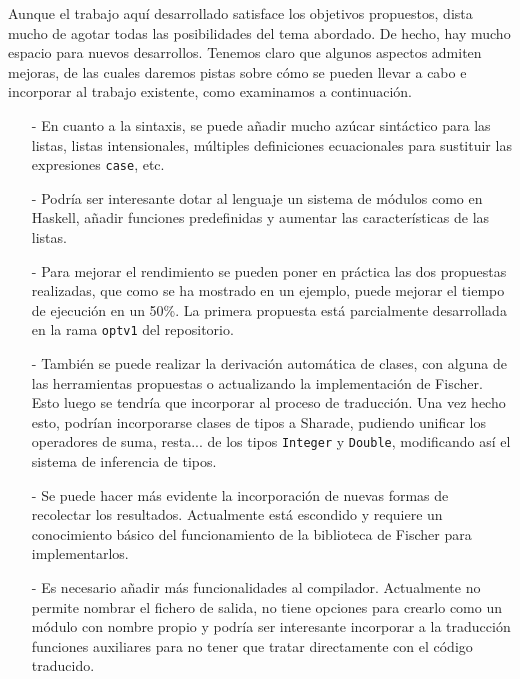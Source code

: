 \documentclass[class=article, crop=false]{standalone}
\begin{document}
Aunque el trabajo aquí desarrollado satisface los objetivos propuestos, dista mucho de agotar
todas las posibilidades del tema abordado. De hecho, hay mucho espacio para nuevos
desarrollos. Tenemos claro que algunos aspectos admiten mejoras, de las cuales daremos pistas
sobre cómo se pueden llevar a cabo e incorporar al trabajo existente, como examinamos a
continuación.

\begin{itemize}
  \item[-] En cuanto a la sintaxis, se puede añadir mucho azúcar sintáctico para las listas,
  listas intensionales, múltiples definiciones ecuacionales para sustituir las expresiones
  \verb`case`, etc.

  \item[-] Podría ser interesante dotar al lenguaje un sistema de módulos como en Haskell,
  añadir funciones predefinidas y aumentar las características de las listas.

  \item[-] Para mejorar el rendimiento se pueden poner en práctica las dos propuestas
  realizadas, que como se ha mostrado en un ejemplo, puede mejorar el tiempo de ejecución en
  un 50\%. La primera propuesta está parcialmente desarrollada en la rama \verb`optv1` del
  repositorio.

  \item[-] También se puede realizar la derivación automática de clases, con alguna de las
  herramientas propuestas o actualizando la implementación de Fischer. Esto luego se tendría
  que incorporar al proceso de traducción. Una vez hecho esto, podrían incorporarse clases de
  tipos a Sharade, pudiendo unificar los operadores de suma, resta... de los tipos
  \verb`Integer` y \verb`Double`, modificando así el sistema de inferencia de
  tipos\cite{smith1994principal}.

  \item[-] Se puede hacer más evidente la incorporación de nuevas formas de recolectar los
  resultados. Actualmente está escondido y requiere un conocimiento básico del funcionamiento
  de la biblioteca de Fischer para implementarlos.

  \item[-] Es necesario añadir más funcionalidades al compilador. Actualmente no permite
  nombrar el fichero de salida, no tiene opciones para crearlo como un módulo con nombre
  propio y podría ser interesante incorporar a la traducción funciones auxiliares para no
  tener que tratar directamente con el código traducido.
\end{itemize}
\end{document}

